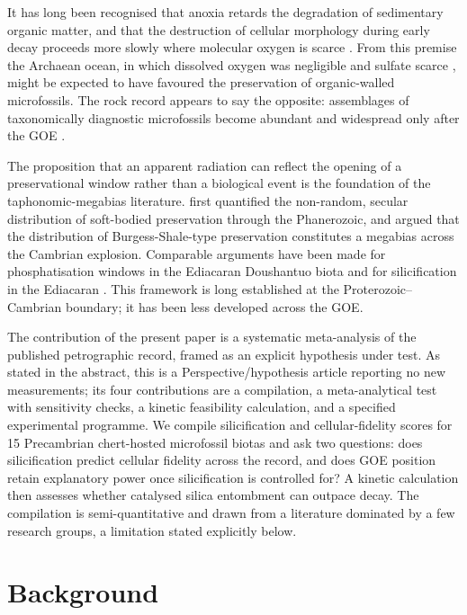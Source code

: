\documentclass[11pt]{article}
\begin{document}
It has long been recognised that anoxia retards the degradation of sedimentary organic matter, and
that the destruction of cellular morphology during early decay proceeds more slowly where molecular
oxygen is scarce \citep{Canfield1994,Hedges1995}. From this premise the Archaean ocean, in which
dissolved oxygen was negligible \citep{Pavlov2002} and sulfate scarce \citep{Habicht2002,Crowe2014},
might be expected to have favoured the preservation of organic-walled microfossils. The rock record
appears to say the opposite: assemblages of taxonomically diagnostic microfossils become abundant
and widespread only after the GOE \citep{Javaux2018,Wacey2014}.

The proposition that an apparent radiation can reflect the opening of a preservational window rather
than a biological event is the foundation of the taphonomic-megabias literature. \citet{Allison1993}
first quantified the non-random, secular distribution of soft-bodied preservation through the
Phanerozoic, and \citet{Butterfield2003} argued that the distribution of Burgess-Shale-type
preservation constitutes a megabias across the Cambrian explosion. Comparable arguments have been
made for phosphatisation windows in the Ediacaran Doushantuo biota and for silicification in the
Ediacaran \citep{Tarhan2016}. This framework is long established at the Proterozoic--Cambrian
boundary; it has been less developed across the GOE.

The contribution of the present paper is a systematic meta-analysis of the published petrographic
record, framed as an explicit hypothesis under test. As stated in the abstract, this is a
Perspective/hypothesis article reporting no new measurements; its four contributions are a
compilation, a meta-analytical test with sensitivity checks, a kinetic feasibility calculation, and a
specified experimental programme. We compile silicification and cellular-fidelity scores for 15
Precambrian chert-hosted microfossil biotas and ask two questions: does silicification predict
cellular fidelity across the record, and does GOE position retain explanatory power once
silicification is controlled for? A kinetic calculation then assesses whether catalysed silica
entombment can outpace decay. The compilation is semi-quantitative and drawn from a literature
dominated by a few research groups, a limitation stated explicitly below.

\section{Background}
\end{document}
